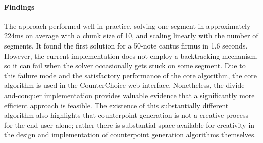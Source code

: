 \paragraph{Findings}
The approach performed well in practice, solving one segment in approximately 224ms on average with a chunk size of 10, and scaling linearly with the number of segments. It found the first solution for a 50-note cantus firmus in 1.6 seconds.
However, the current implementation does not employ a backtracking mechanism, so it can fail when the solver occasionally gets stuck on some segment. Due to this failure mode and the satisfactory performance of the core algorithm, the core algorithm is used in the CounterChoice web interface.
Nonetheless, the divide-and-conquer implementation provides valuable evidence that a significantly more efficient approach is feasible.
The existence of this substantially different algorithm also highlights that counterpoint generation is not a creative process for the end user alone; rather there is substantial space available for creativity in the design and implementation of counterpoint generation algorithms themselves.



